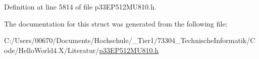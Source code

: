 Definition at line 5814 of file p33\+E\+P512\+M\+U810.\+h.



The documentation for this struct was generated from the following file\+:\begin{DoxyCompactItemize}
\item 
C\+:/\+Users/00670/\+Documents/\+Hochschule/\+\_\+\+Tier1/73304\+\_\+\+Technische\+Informatik/\+Code/\+Hello\+World4.\+X/\+Literatur/\hyperlink{p33_e_p512_m_u810_8h}{p33\+E\+P512\+M\+U810.\+h}\end{DoxyCompactItemize}
